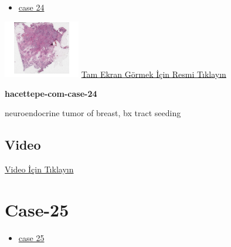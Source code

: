 \documentclass[
  letterpaper,
  DIV=11,
  numbers=noendperiod]{scrreprt}
\providecommand{\tightlist}{%
  \setlength{\itemsep}{0pt}\setlength{\parskip}{0pt}}\usepackage{longtable,booktabs,array}
\begin{document}
\begin{itemize}
\tightlist
\item
  \href{https://www.youtube.com/watch?v=-S0_Hr6sNZ8\&ab_channel=KemalKosemehmetoglu}{case
  24}
\end{itemize}

\href{https://images.patolojiatlasi.com/hacettepe-com-case-24/HE.html}{\includegraphics[width=0.25\textwidth,height=\textheight]{./screenshots/hacettepe-com-case-24_screenshot.png}}
\href{https://images.patolojiatlasi.com/hacettepe-com-case-24/HE.html}{Tam
Ekran Görmek İçin Resmi Tıklayın}

\textbf{hacettepe-com-case-24}

\begin{tcolorbox}[enhanced jigsaw, left=2mm, toprule=.15mm, rightrule=.15mm, bottomrule=.15mm, leftrule=.75mm, colback=white, colframe=quarto-callout-tip-color-frame, toptitle=1mm, breakable, titlerule=0mm, colbacktitle=quarto-callout-tip-color!10!white, bottomtitle=1mm, title=\textcolor{quarto-callout-tip-color}{\faLightbulb}\hspace{0.5em}{Tanı}, arc=.35mm, opacitybacktitle=0.6, opacityback=0, coltitle=black]

neuroendocrine tumor of breast, bx tract seeding

\end{tcolorbox}

\hypertarget{video-22}{%
\subsection{Video}\label{video-22}}

\href{https://www.youtube.com/watch?v=-S0_Hr6sNZ8}{Video İçin Tıklayın}

\hypertarget{sec-hacettepe-case-of-the-month-case-25}{%
\section{Case-25}\label{sec-hacettepe-case-of-the-month-case-25}}

\begin{itemize}
\tightlist
\item
  \href{https://www.youtube.com/watch?v=tcmQKs38A14\&ab_channel=KemalKosemehmetoglu}{case
  25}
\end{itemize}
\end{document}
